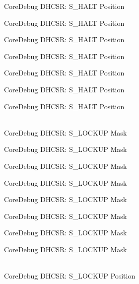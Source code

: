 \begin{DoxyRefList}
\label{deprecated__deprecated000117}%
%
Core\+Debug DHCSR:\+ S\+\_\+\+HALT Position 

\label{deprecated__deprecated000171}%
%
Core\+Debug DHCSR:\+ S\+\_\+\+HALT Position 

\label{deprecated__deprecated000256}%
%
Core\+Debug DHCSR:\+ S\+\_\+\+HALT Position 

\label{deprecated__deprecated000313}%
%
Core\+Debug DHCSR:\+ S\+\_\+\+HALT Position 

\label{deprecated__deprecated000389}%
%
Core\+Debug DHCSR:\+ S\+\_\+\+HALT Position 

\label{deprecated__deprecated000476}%
%
Core\+Debug DHCSR:\+ S\+\_\+\+HALT Position 

\label{deprecated__deprecated000578}%
%
Core\+Debug DHCSR:\+ S\+\_\+\+HALT Position  
\item[{\parbox[t]{\linewidth}{Global \doxylink{group__CMSIS__CoreDebug_ga7b67e4506d7f464ef5dafd6219739756}{Core\+Debug\+\_\+\+DHCSR\+\_\+\+S\+\_\+\+LOCKUP\+\_\+\+Msk} }}]\hfill \\
\label{deprecated__deprecated000022}%
%
Core\+Debug DHCSR:\+ S\+\_\+\+LOCKUP Mask 

\label{deprecated__deprecated000114}%
%
Core\+Debug DHCSR:\+ S\+\_\+\+LOCKUP Mask 

\label{deprecated__deprecated000168}%
%
Core\+Debug DHCSR:\+ S\+\_\+\+LOCKUP Mask 

\label{deprecated__deprecated000253}%
%
Core\+Debug DHCSR:\+ S\+\_\+\+LOCKUP Mask 

\label{deprecated__deprecated000310}%
%
Core\+Debug DHCSR:\+ S\+\_\+\+LOCKUP Mask 

\label{deprecated__deprecated000386}%
%
Core\+Debug DHCSR:\+ S\+\_\+\+LOCKUP Mask 

\label{deprecated__deprecated000473}%
%
Core\+Debug DHCSR:\+ S\+\_\+\+LOCKUP Mask 

\label{deprecated__deprecated000575}%
%
Core\+Debug DHCSR:\+ S\+\_\+\+LOCKUP Mask  
\item[{\parbox[t]{\linewidth}{Global \doxylink{group__CMSIS__CoreDebug_ga2900dd56a988a4ed27ad664d5642807e}{Core\+Debug\+\_\+\+DHCSR\+\_\+\+S\+\_\+\+LOCKUP\+\_\+\+Pos} }}]\hfill \\
\label{deprecated__deprecated000021}%
%
Core\+Debug DHCSR:\+ S\+\_\+\+LOCKUP Position 


\end{DoxyRefList}
